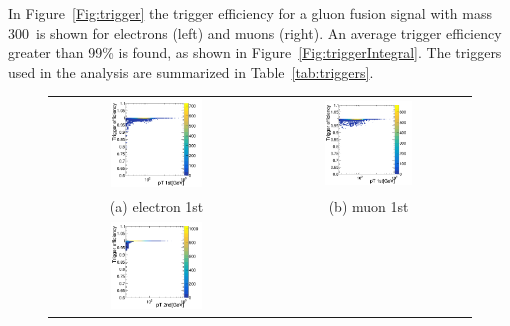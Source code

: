 In Figure~\ref{Fig:trigger} the trigger efficiency for a gluon fusion signal
with mass 300~\GeV is shown for electrons (left) and muons (right).
An average trigger efficiency greater than 99\% is found, as shown in Figure~\ref{Fig:triggerIntegral}. The triggers used in the analysis are summarized in Table~\ref{tab:triggers}. 
\begin{figure}[htbp]
\centering
\begin{tabular}{cc}
 \includegraphics[width=0.45\textwidth]{../AN/Figs/Trigger/ele1.png} &
 \includegraphics[width=0.45\textwidth]{../AN/Figs/Trigger/mu1.png} \\
 (a) electron 1st & (b) muon 1st \\
 \includegraphics[width=0.45\textwidth]{../AN/Figs/Trigger/ele2.png} &

\end{tabular}
\end{figure}
